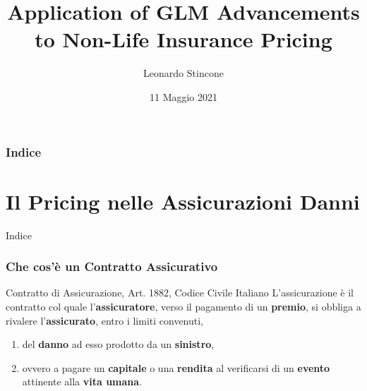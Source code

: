 \documentclass[pdf, aspectratio=169]{beamer}\usepackage[]{graphicx}\usepackage[]{color}
\title{Application of GLM Advancements \\ to Non-Life Insurance Pricing}
\author{Leonardo Stincone}
\date{11 Maggio 2021}
\institute[units]{Università degli Studi di Trieste}
\theoremstyle{definition}
\begin{document}
\begin{frame}
\titlepage
\end{frame}



\begin{frame}
\frametitle{Indice}

\tableofcontents


\end{frame}


\section{Il Pricing nelle Assicurazioni Danni}

\begin{frame}{Indice}
  \tableofcontents[currentsection]
\end{frame}


\begin{frame}
\frametitle{Che cos'è un Contratto Assicurativo}

\begin{block}{Contratto di Assicurazione, Art. 1882, Codice Civile Italiano}
  L'assicurazione è il contratto col quale l'{\bfseries assicuratore}, verso il pagamento di un {\bfseries premio}, si obbliga a rivalere l'{\bfseries assicurato}, entro i limiti convenuti,
  
  \begin{enumerate}
    \item del {\bfseries danno} ad esso prodotto da un {\bfseries sinistro},
    \item ovvero a pagare un {\bfseries capitale} o una {\bfseries rendita} al verificarsi di un {\bfseries evento} attinente alla {\bfseries vita umana}.
  \end{enumerate}
\end{block}

\end{frame}
\end{document}
